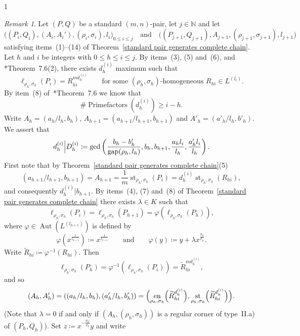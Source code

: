 \documentclass[reqno,a4paper,twoside]{amsart}
\theoremstyle{definition}
\theoremstyle{remark}
\newtheorem{remark}[theorem]{Remark}
\DeclareMathOperator{\Aut}{Aut}
\DeclareMathOperator{\gap}{gap}
\DeclareMathOperator{\en}{en}
\DeclareMathOperator{\st}{st}
\DeclareMathOperator{\Primefactors}{Prime factors}
\begin{document}
\begin{spacing}{1}
\begin{remark}\label{rem 2.21} Let $(P,Q)$ be a standard $(m,n)$-pair, let $j\in \mathds{N}$ and let
$$
\bigl((P_i,Q_i),(A_i,A_i'),(\rho_i,\sigma_i),l_i\bigr)_{0\le i\le j}\quad\text{and}\quad \bigl((P_{j+1},Q_{j+1}),A_{j+1},(\rho_{j+1},\sigma_{j+1}),l_{j+1}\bigr)
$$
satisfying items~(1)--(14) of Theorem~\ref{standard pair generates complete chain}. Let $h$ and $i$ be integers with $0\le h\le i\le j$. By items~(3), (5) and~(6), and \cite{GGV1}*{Theorem~7.6(2)}, there exists $d_h^{(i)}$ maximum such that
\begin{equation}\label{eq1}
\ell_{\rho_h,\sigma_h}(P_i) = R_{hi}^{m d_h^{(i)}}\qquad\text{for some $(\rho_h,\sigma_h)$-homogeneous $R_{hi}\in L^{(l_i)}$.}
\end{equation}
By item~(8) of~\cite{GGV1}*{Theorem~7.6} we know that
\begin{equation}\label{eqp5}
\# \Primefactors (d_h^{(i)})\ge i-h.
\end{equation}
Write $A_h = (a_h/l_h,b_h)$, $A_{h+1} = (a_{h+1}/l_{h+1},b_{h+1})$ and $A'_h = (a'_h/l_h,b'_h)$. We assert that
\vspace{1pt}
\begin{equation}\label{eq5}
d_h^{(i)}\Big| D_h^{(i)}\coloneqq \gcd\left(\frac{b_h-b'_h}{\gap(\rho_h,l_h)},b_h,b_{h+1},\frac{a_h l_i}{l_h},\frac{a'_h l_i}{l_h}\right).
\vspace{1pt}
\end{equation}
First note that by Theorem~\ref{standard pair generates complete chain}(5)
$$
(a_{h+1}/l_{h+1},b_{h+1}) = A_{h+1} = \frac 1m \st_{\rho_h,\sigma_h}(P_i)=d^{(i)}_h\st_{\rho_h,\sigma_h}(R_{hi}),
$$
and consequently $d_h^{(i)}|b_{h+1}$. By items~(4), (7) and~(8) of Theorem~\ref{standard pair generates complete chain} there exists $\lambda\in K$ such that
$$
\ell_{\rho_h,\sigma_h}(P_i) = \ell_{\rho_h,\sigma_h}(P_{h+1}) = \varphi(\ell_{\rho_h,\sigma_h}(P_h)),
$$
where $\varphi\in \Aut(L^{(l_{h+1})})$ is defined by
$$
\varphi(x^{\frac{1}{l_{h+1}}})\coloneqq x^{\frac{1}{l_{h+1}}}\qquad\text{and}\qquad \varphi(y)\coloneqq y + \lambda x^{\frac{\sigma_h}{\rho_h}}.
$$
Write $\widetilde{R}_{hi}\coloneqq \varphi^{-1}(R_{hi})$. Then
$$
\ell_{\rho_h,\sigma_h}(P_h) = \varphi^{-1}(\ell_{\rho_h,\sigma_h}(P_i)) = \widetilde R_{hi}^{m d_h^{(i)}},
$$
and so
$$
(A_h,A'_h)=((a_h/l_h,b_h),(a'_h/l_h,b'_h))=\Bigl(\en_{\rho_h,\sigma_h}\Bigl(\widetilde R_{hi}^{d_h^{(i)}}\Bigr),\st_{\rho_h,\sigma_h}\Bigl(\widetilde R_{hi}^{d_h^{(i)}}\Bigr)\Bigr).
$$
(Note that $\lambda = 0$ if and only if $(A_h,(\rho_h,\sigma_h))$ is a regular corner of type~II.a) of $(P_h,Q_h)$). Set  $z\coloneqq x^{-\frac{\sigma_h}{\rho_h}}y$ and write

\end{remark}
\end{spacing}
\end{document}
